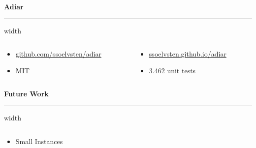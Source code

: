 \documentclass[english, aspectratio=169]{beamer}
\begin{document}
%
%
%
%
\begin{frame}{}

  {\Large \textbf{Adiar}}
  \vspace{1pt} {\hrule width\linewidth}

  \begin{columns}
    \begin{column}[t]{0.45\linewidth}
      \begin{itemize}
      \item[\faIcon{code}]
        \href{http://github.com/ssoelvsten/adiar}{github.com/ssoelvsten/adiar}
      \item[\faIcon{balance-scale}]
        MIT
      \end{itemize}
    \end{column}
    \begin{column}[t]{0.45\linewidth}
      \begin{itemize}
      \item[\faIcon{book}\hspace{2pt}]
        \href{http://ssoelvsten.github.io/adiar}{ssoelvsten.github.io/adiar}
      \item[\faIcon{check}]
        3.462 unit tests
      \end{itemize}
    \end{column}
  \end{columns}

  \bigskip\pause

  {\Large \textbf{Future Work}}
  \vspace{1pt} {\hrule width\linewidth}

  \begin{columns}
    \begin{column}[t]{0.45\linewidth}
      \begin{itemize}
      \item[\faIcon{rocket}]
        Small Instances


\end{itemize}
\end{column}
\end{columns}
\end{frame}
\end{document}

